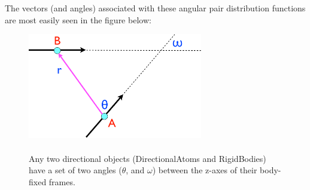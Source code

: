 \documentclass[]{book}
\begin{document}
The vectors (and angles) associated with these angular pair
distribution functions are most easily seen in the figure below:

\begin{figure}
\centering
\includegraphics[width=3in]{definition.pdf}
\caption[Definitions of the angles between directional objects]{ \\ Any
two directional objects (DirectionalAtoms and RigidBodies) have a set
of two angles ($\theta$, and $\omega$) between the z-axes of their
body-fixed frames.} 
\label{fig:gofr}
\end{figure}
\end{document}
